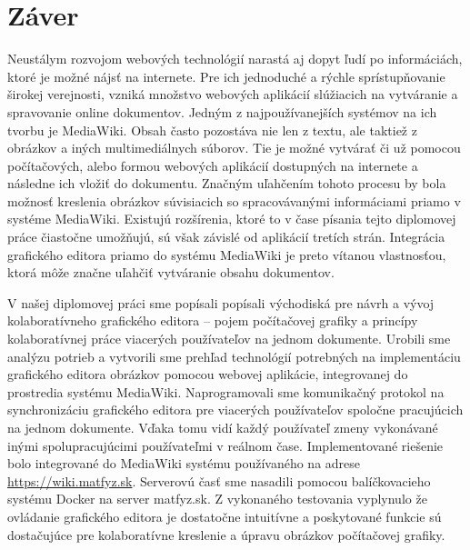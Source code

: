 \chapter{Záver}\label{chap:conclusion}
Neustálym rozvojom webových technológií narastá aj dopyt ľudí po informáciách, ktoré je možné nájsť na internete. Pre ich jednoduché a rýchle sprístupňovanie širokej verejnosti, vzniká množstvo webových aplikácií slúžiacich na vytváranie a spravovanie online dokumentov. Jedným z najpoužívanejších systémov na ich tvorbu je MediaWiki. Obsah často pozostáva nie len z textu, ale taktiež z obrázkov a iných multimediálnych súborov. Tie je možné vytvárať či už pomocou počítačových, alebo formou webových aplikácií dostupných na internete a následne ich vložiť do dokumentu. Značným uľahčením tohoto procesu by bola možnosť kreslenia obrázkov súvisiacich so spracovávanými informáciami priamo v systéme MediaWiki. Existujú rozšírenia, ktoré to v čase písania tejto diplomovej práce čiastočne umožňujú, sú však závislé od aplikácií tretích strán. Integrácia grafického editora priamo do systému MediaWiki je preto vítanou vlastnosťou, ktorá môže značne uľahčiť vytváranie obsahu dokumentov.

V našej diplomovej práci sme popísali popísali východiská pre návrh a vývoj kolaboratívneho grafického editora -- pojem počítačovej grafiky a princípy kolaboratívnej práce viacerých používateľov na jednom dokumente. Urobili sme analýzu potrieb a vytvorili sme prehľad technológií potrebných na implementáciu grafického editora obrázkov pomocou webovej aplikácie, integrovanej do prostredia systému MediaWiki. Naprogramovali sme komunikačný protokol na synchronizáciu grafického editora pre viacerých používateľov spoločne pracujúcich na jednom dokumente. Vďaka tomu vidí každý používateľ zmeny vykonávané inými spolupracujúcimi používateľmi v reálnom čase. Implementované riešenie bolo integrované do MediaWiki systému používaného na adrese \url{https://wiki.matfyz.sk}. Serverovú časť sme nasadili pomocou balíčkovacieho systému Docker na server matfyz.sk. Z vykonaného testovania vyplynulo že ovládanie grafického editora je dostatočne intuitívne a poskytované funkcie sú dostačujúce pre kolaboratívne kreslenie a úpravu obrázkov počítačovej grafiky.